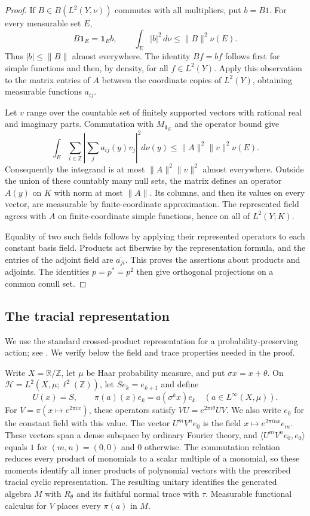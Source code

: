 \begin{proof}
If $B\in B(L^2(Y,\nu))$ commutes with all multipliers, put $b=B1$.
For every measurable set $E$,
\[
 B\mathbf1_E=\mathbf1_E b,\qquad
 \int_E|b|^2\,d\nu\le\|B\|^2\nu(E).
\]
Thus $|b|\le\|B\|$ almost everywhere.  The identity $Bf=bf$ follows
first for simple functions and then, by density, for all $f\in L^2(Y)$.
Apply this observation to the matrix entries of $A$ between the coordinate
copies of $L^2(Y)$, obtaining measurable functions $a_{ij}$.

Let $v$ range over the countable set of finitely supported vectors with
rational real and imaginary parts.  Commutation with $M_{\mathbf1_E}$ and
the operator bound give
\[
 \int_E\sum_{i\in\mathbb Z}
       \left|\sum_j a_{ij}(y)v_j\right|^2d\nu(y)
 \le\|A\|^2\|v\|^2\nu(E).
\]
Consequently the integrand is at most $\|A\|^2\|v\|^2$ almost everywhere.
Outside the union of these countably many null sets, the matrix defines
an operator $A(y)$ on $K$ with norm at most $\|A\|$.  Its columns, and
then its values on every vector, are measurable by finite-coordinate
approximation.  The represented field agrees with $A$ on finite-coordinate
simple functions, hence on all of $L^2(Y;K)$.

Equality of two such fields follows by applying their represented
operators to each constant basis field.  Products act fiberwise by the
representation formula, and the entries of the adjoint field are
$\overline{a_{ji}}$.  This proves the assertions about products and
adjoints.  The identities $p=p^*=p^2$ then give orthogonal projections
on a common conull set.
\end{proof}

\subsection{The tracial representation}

We use the standard crossed-product representation for a
probability-preserving action; see
\citet[Section~1.4 and Proposition~1.4.5]{AnantharamanPopa}.
We verify below the field and trace properties needed in the proof.

Write $X=\mathbb R/\mathbb Z$, let $\mu$ be Haar probability measure, and put
$\sigma x=x+\theta$.  On
$\mathcal H=L^2(X,\mu;\ell^2(\mathbb Z))$, let $S e_k=e_{k+1}$ and define
\[
 U(x)=S,\qquad
 \pi(a)(x)e_k=a(\sigma^k x)e_k\quad(a\in L^\infty(X,\mu)).
\]
For $V=\pi(x\mapsto e^{2\pi i x})$, these operators satisfy
$VU=e^{2\pi i\theta}UV$.
We also write $e_0$ for the constant field with this value.
The vector $U^mV^n e_0$ is the field $x\mapsto e^{2\pi i nx}e_m$.
These vectors span a dense subspace by ordinary Fourier theory, and
$\langle U^mV^n e_0,e_0\rangle$ equals $1$ for $(m,n)=(0,0)$ and $0$
otherwise.  The commutation relation reduces every product of monomials
to a scalar multiple of a monomial, so these moments identify all inner
products of polynomial vectors with the prescribed tracial cyclic
representation.  The resulting unitary identifies the generated algebra
$M$ with $R_\theta$ and its faithful normal trace with $\tau$.
Measurable functional calculus for $V$ places every $\pi(a)$ in $M$.

